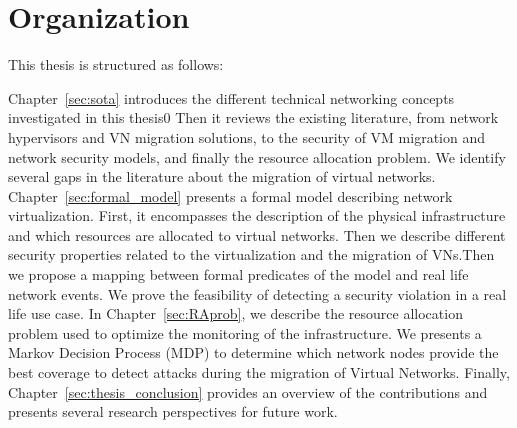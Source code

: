 
\section{Organization}
This thesis is structured as follows: 


Chapter~\ref{sec:sota} introduces the different technical networking concepts investigated in this thesis0 Then it reviews the existing literature, from network hypervisors and VN migration solutions, to the security of VM migration and network security models, and finally the resource allocation problem. We identify several gaps in the literature about the migration of virtual networks.
Chapter~\ref{sec:formal_model} presents a formal model describing network virtualization. 
First, it encompasses the description of the physical infrastructure and which resources are allocated to virtual networks. Then we describe different security properties related to the virtualization and the migration of VNs.Then we propose a mapping between formal predicates of the model and real life network events. We prove the feasibility of detecting a security violation in a real life use case.
In Chapter~\ref{sec:RAprob}, we describe  the resource allocation problem used to optimize the monitoring of the infrastructure.
We presents a Markov Decision Process (MDP) to determine which network nodes provide the best coverage to detect attacks during the migration of Virtual Networks.
Finally, Chapter~\ref{sec:thesis_conclusion} provides an overview of the contributions and presents several research perspectives for future work.
